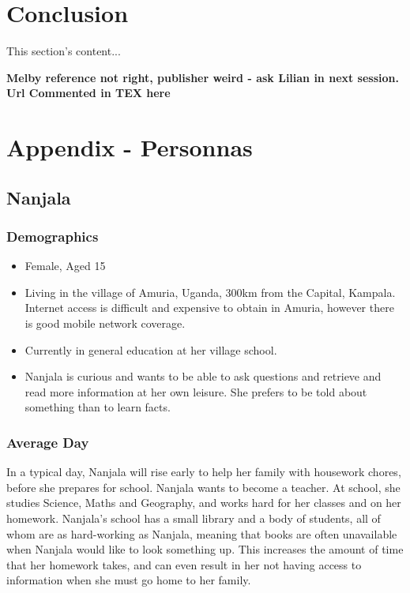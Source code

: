 \documentclass{article}
\begin{document}
\section{Conclusion}
\label{sec:conclusion}
This section's content...

\newpage

{\bf Melby reference not right, publisher weird - ask Lilian in next session.  Url Commented in TEX here} 



\newpage
\section{Appendix - Personnas}
\label{sec:appendixPersonnas}
\subsection{Nanjala}
\subsubsection{Demographics}
\begin{itemize}
  \item Female, Aged 15
  \item Living in the village of Amuria, Uganda, 300km from the Capital, Kampala.  Internet access is difficult and expensive to obtain in Amuria, however there is good mobile network coverage.
  \item Currently in general education at her village school.
  \item Nanjala is curious and wants to be able to ask questions and retrieve and read more information at her own leisure.  She prefers to be told about something than to learn facts.
\end{itemize}
\subsubsection{Average Day}
In a typical day, Nanjala will rise early to help her family with housework chores, before she prepares for school.  Nanjala wants to become a teacher.  At school, she studies Science, Maths and Geography, and works hard for her classes and on her homework.  Nanjala's school has a small library and a body of students, all of whom are as hard-working as Nanjala, meaning that books are often unavailable when Nanjala would like to look something up.  This increases the amount of time that her homework takes, and can even result in her not having access to information when she must go home to her family.
\end{document}
